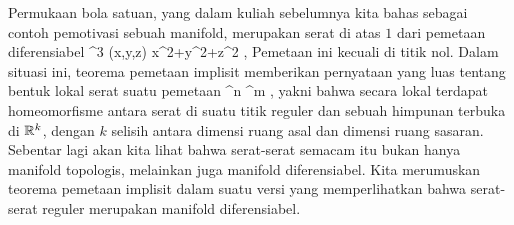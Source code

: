 \setcounter{section}{8}


Permukaan bola satuan, yang dalam kuliah sebelumnya kita bahas sebagai contoh pemotivasi sebuah manifold, merupakan serat di atas $1$ dari pemetaan diferensiabel
\maabbeledisp {} { \R^3 } { \R
} { (x,y,z) } { x^2+y^2+z^2
} {,}
Pemetaan ini
kecuali di titik nol. Dalam situasi ini, teorema pemetaan implisit memberikan pernyataan yang luas tentang bentuk lokal serat suatu pemetaan
\maabb {\varphi} {\R^n} { \R^m
} {,}
yakni bahwa secara lokal terdapat homeomorfisme antara serat di suatu titik reguler dan sebuah himpunan terbuka di ${\mathbb R}^k$, dengan $k$ selisih antara dimensi ruang asal dan dimensi ruang sasaran. Sebentar lagi akan kita lihat bahwa serat-serat semacam itu bukan hanya manifold topologis, melainkan juga manifold diferensiabel. Kita merumuskan teorema pemetaan implisit dalam suatu versi yang memperlihatkan bahwa serat-serat reguler merupakan manifold diferensiabel.




